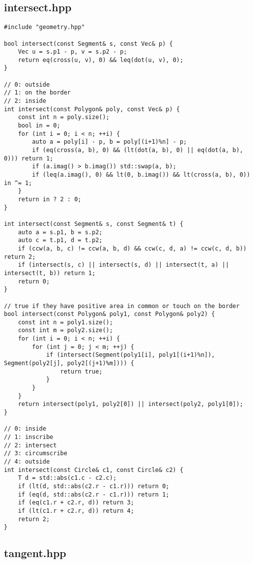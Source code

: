 \subsection{intersect.hpp}

\begin{lstlisting}
#include "geometry.hpp"

bool intersect(const Segment& s, const Vec& p) {
    Vec u = s.p1 - p, v = s.p2 - p;
    return eq(cross(u, v), 0) && leq(dot(u, v), 0);
}

// 0: outside
// 1: on the border
// 2: inside
int intersect(const Polygon& poly, const Vec& p) {
    const int n = poly.size();
    bool in = 0;
    for (int i = 0; i < n; ++i) {
        auto a = poly[i] - p, b = poly[(i+1)%n] - p;
        if (eq(cross(a, b), 0) && (lt(dot(a, b), 0) || eq(dot(a, b), 0))) return 1;
        if (a.imag() > b.imag()) std::swap(a, b);
        if (leq(a.imag(), 0) && lt(0, b.imag()) && lt(cross(a, b), 0)) in ^= 1;
    }
    return in ? 2 : 0;
}

int intersect(const Segment& s, const Segment& t) {
    auto a = s.p1, b = s.p2;
    auto c = t.p1, d = t.p2;
    if (ccw(a, b, c) != ccw(a, b, d) && ccw(c, d, a) != ccw(c, d, b)) return 2;
    if (intersect(s, c) || intersect(s, d) || intersect(t, a) || intersect(t, b)) return 1;
    return 0;
}

// true if they have positive area in common or touch on the border
bool intersect(const Polygon& poly1, const Polygon& poly2) {
    const int n = poly1.size();
    const int m = poly2.size();
    for (int i = 0; i < n; ++i) {
        for (int j = 0; j < m; ++j) {
            if (intersect(Segment(poly1[i], poly1[(i+1)%n]), Segment(poly2[j], poly2[(j+1)%m]))) {
                return true;
            }
        }
    }
    return intersect(poly1, poly2[0]) || intersect(poly2, poly1[0]);
}

// 0: inside
// 1: inscribe
// 2: intersect
// 3: circumscribe
// 4: outside
int intersect(const Circle& c1, const Circle& c2) {
    T d = std::abs(c1.c - c2.c);
    if (lt(d, std::abs(c2.r - c1.r))) return 0;
    if (eq(d, std::abs(c2.r - c1.r))) return 1;
    if (eq(c1.r + c2.r, d)) return 3;
    if (lt(c1.r + c2.r, d)) return 4;
    return 2;
}
\end{lstlisting}

\subsection{tangent.hpp}

